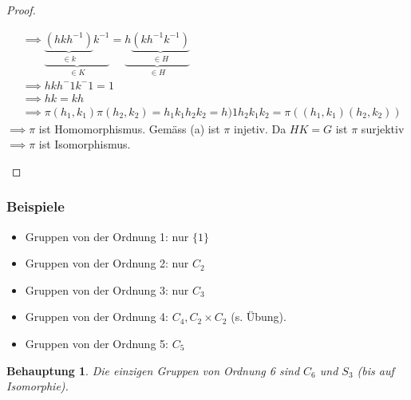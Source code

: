 \documentclass{article}
\theoremstyle{plain}
\newtheorem{behauptung}{Behauptung}
\begin{document}
\begin{proof}
\begin{enumerate}[label=(\alph*)]
        \begin{align*}
        &\implies \underbrace{\underbrace{(hkh^{-1})}_{\in k}k^{-1}}_{\in K} = \underbrace{h\underbrace{(kh^{-1}k^{-1})}_{\in H}}_{\in H}\\
        &\implies hkh^-1k^-1 = 1\\
        &\implies hk=kh\\
        &\implies \pi(h_1,k_1)\pi(h_2,k_2) = h_1k_1h_2k_2=h)1h_2k_1k_2=\pi((h_1,k_1)(h_2,k_2))
        \end{align*}
        $\implies \pi$ ist Homomorphismus.
        Gemäss (a) ist $\pi$ injetiv. Da $HK=G$ ist $\pi$ surjektiv $\implies \pi$ ist Isomorphismus.
    \end{enumerate}
\end{proof}

\subsubsection*{Beispiele}
\begin{itemize}
    \item Gruppen von der Ordnung 1: nur $\{1\}$
    \item Gruppen von der Ordnung 2: nur $C_2$
    \item Gruppen von der Ordnung 3: nur $C_3$
    \item Gruppen von der Ordnung 4: $C_4, C_2\times C_2$ (s. Übung).
    \item Gruppen von der Ordnung 5: $C_5$
\end{itemize}
\begin{behauptung}
    Die einzigen Gruppen von Ordnung 6 sind $C_6$ und $S_3$ (bis auf Isomorphie).
\end{behauptung}
\end{document}
